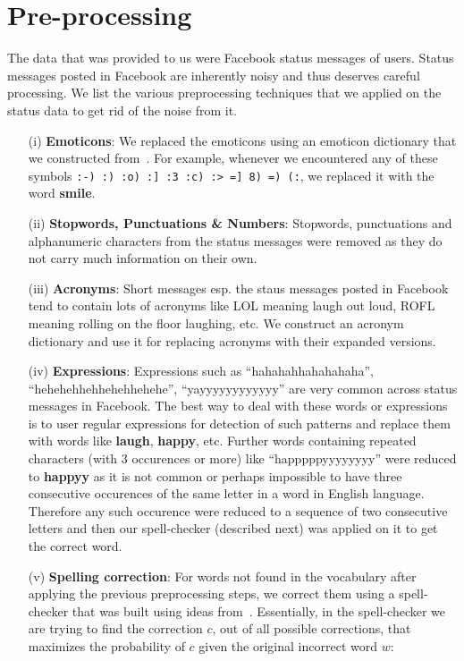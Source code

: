 \section{Pre-processing}
\label{sec:preprocessing}

The data that was provided to us were Facebook status messages of users. Status messages posted in Facebook are inherently noisy and thus deserves careful processing. We list the various preprocessing techniques that we applied on the status data to get rid of the noise from it. 
\begin{itemize}
\item[(i)] {\bf Emoticons}: We replaced the emoticons using an emoticon dictionary that we constructed from~\cite{emoticondict}. For example, whenever we encountered any of these symbols \texttt{:-) :) :o) :] :3 :c) :> =] 8) =) (:}, we replaced it with the word {\bf smile}.
\item[(ii)] {\bf Stopwords, Punctuations \& Numbers}: Stopwords, punctuations and alphanumeric characters from the status messages were removed as they do not carry much information on their own.
\item[(iii)] {\bf Acronyms}: Short messages esp. the staus messages posted in Facebook tend to contain lots of acronyms like LOL meaning laugh out loud, ROFL meaning rolling on the floor laughing, etc. We construct an acronym dictionary and use it for replacing acronyms with their expanded versions.
\item[(iv)] {\bf Expressions}: Expressions such as ``hahahahhahahahaha'', ``hehehehhehhehehhehehe'', ``yayyyyyyyyyyyy'' are very common across status messages in Facebook. The best way to deal with these words or expressions is to user regular expressions for detection of such patterns and replace them with words like {\bf laugh}, {\bf happy}, etc. Further words containing repeated characters (with 3 occurences or more) like ``happpppyyyyyyyy'' were reduced to {\bf happyy} as it is not common or perhaps impossible to have three consecutive occurences of the same letter in a word in English language. Therefore any such occurence were reduced to a sequence of two consecutive letters and then our spell-checker (described next) was applied on it to get the correct word.
\item[(v)] {\bf Spelling correction}: For words not found in the vocabulary after applying the previous preprocessing steps, we correct them using a spell-checker that was built using ideas from~\cite{spellcheck}. Essentially, in the spell-checker we are trying to find the correction $c$, out of all possible corrections, that maximizes the probability of $c$ given the original incorrect word $w$:

\end{itemize}
